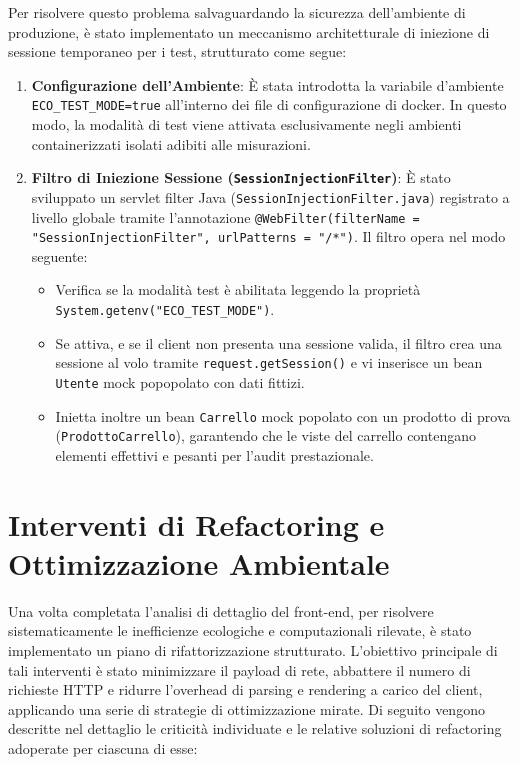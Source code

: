 Per risolvere questo problema salvaguardando la sicurezza dell'ambiente di produzione, è stato implementato un meccanismo architetturale di iniezione di sessione temporaneo per i test, strutturato come segue:

\begin{enumerate}
    \item \textbf{Configurazione dell'Ambiente}: È stata introdotta la variabile d'ambiente \texttt{ECO\_TEST\_MODE=true} all'interno dei file di configurazione di docker. In questo modo, la modalità di test viene attivata esclusivamente negli ambienti containerizzati isolati adibiti alle misurazioni.

    \item \textbf{Filtro di Iniezione Sessione (\texttt{SessionInjectionFilter})}: È stato sviluppato un servlet filter Java (\texttt{SessionInjectionFilter.java}) registrato a livello globale tramite l'annotazione \texttt{@WebFilter(filterName = "SessionInjectionFilter", urlPatterns = "/*")}. Il filtro opera nel modo seguente:
    \begin{itemize}
        \item Verifica se la modalità test è abilitata leggendo la proprietà \texttt{System.getenv("ECO\_TEST\_MODE")}.
        \item Se attiva, e se il client non presenta una sessione valida, il filtro crea una sessione al volo tramite \texttt{request.getSession()} e vi inserisce un bean \texttt{Utente} mock popopolato con dati fittizi.
        \item Inietta inoltre un bean \texttt{Carrello} mock popolato con un prodotto di prova (\texttt{ProdottoCarrello}), garantendo che le viste del carrello contengano elementi effettivi e pesanti per l'audit prestazionale.
    \end{itemize}
\end{enumerate}

\section{Interventi di Refactoring e Ottimizzazione Ambientale}

Una volta completata l'analisi di dettaglio del front-end, per risolvere sistematicamente le inefficienze ecologiche e computazionali rilevate, è stato implementato un piano di rifattorizzazione strutturato. L'obiettivo principale di tali interventi è stato minimizzare il payload di rete, abbattere il numero di richieste HTTP e ridurre l'overhead di parsing e rendering a carico del client, applicando una serie di strategie di ottimizzazione mirate. Di seguito vengono descritte nel dettaglio le criticità individuate e le relative soluzioni di refactoring adoperate per ciascuna di esse:

